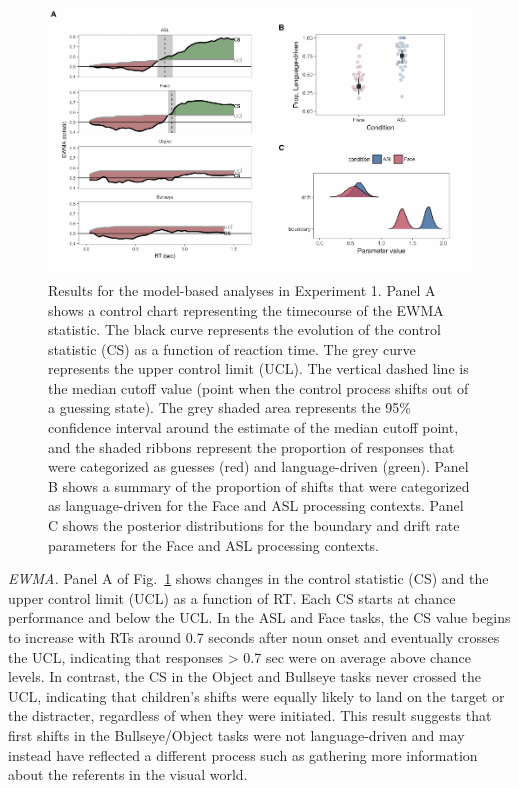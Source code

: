 \documentclass[english,floatsintext,man]{apa6}
\theoremstyle{definition}
\theoremstyle{definition}
\theoremstyle{definition}
\theoremstyle{remark}
\begin{document}
\begin{figure}[H]

{\centering \includegraphics[width=0.9\linewidth]{figs/trio-model-plot-1} 

}

\caption{Results for the model-based analyses in Experiment 1. Panel A shows a control chart representing the timecourse of the EWMA statistic. The black curve represents the evolution of the control statistic (CS) as a function of reaction time. The grey curve represents the upper control limit (UCL). The vertical dashed line is the median cutoff value (point when the control process shifts out of a guessing state). The grey shaded area represents the 95\% confidence interval around the estimate of the median cutoff point, and the shaded ribbons represent the proportion of responses that were categorized as guesses (red) and language-driven (green). Panel B shows a summary of the proportion of shifts that were categorized as language-driven for the Face and ASL processing contexts. Panel C shows the posterior distributions for the boundary and drift rate parameters for the Face and ASL processing contexts.}\label{fig:trio-model-plot}
\end{figure}

\emph{EWMA.} Panel A of Fig.~\ref{fig:trio-model-plot} shows changes in
the control statistic (CS) and the upper control limit (UCL) as a
function of RT. Each CS starts at chance performance and below the UCL.
In the ASL and Face tasks, the CS value begins to increase with RTs
around 0.7 seconds after noun onset and eventually crosses the UCL,
indicating that responses \textgreater{} 0.7 sec were on average above
chance levels. In contrast, the CS in the Object and Bullseye tasks
never crossed the UCL, indicating that children's shifts were equally
likely to land on the target or the distracter, regardless of when they
were initiated. This result suggests that first shifts in the
Bullseye/Object tasks were not language-driven and may instead have
reflected a different process such as gathering more information about
the referents in the visual world.
\end{document}

